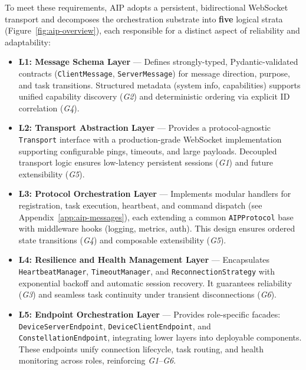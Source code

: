 To meet these requirements, AIP adopts a persistent, bidirectional WebSocket transport and decomposes the
orchestration substrate into \textbf{five} logical strata (Figure~\ref{fig:aip-overview}), each responsible for a distinct aspect of reliability and adaptability:
\begin{itemize}[leftmargin=2em]
    \item \textbf{L1: Message Schema Layer} — Defines strongly-typed, Pydantic-validated contracts (\texttt{ClientMessage}, \texttt{ServerMessage}) for message direction, purpose, and task transitions. Structured metadata (system info, capabilities) supports unified capability discovery (\textit{G2}) and deterministic ordering via explicit ID correlation (\textit{G4}).

    \item \textbf{L2: Transport Abstraction Layer} — Provides a protocol-agnostic \texttt{Transport} interface with a production-grade WebSocket implementation supporting configurable pings, timeouts, and large payloads. Decoupled transport logic ensures low-latency persistent sessions (\textit{G1}) and future extensibility (\textit{G5}).
    
    \item \textbf{L3: Protocol Orchestration Layer} — Implements modular handlers for registration, task execution, heartbeat, and command dispatch (see Appendix~\ref{app:aip-messages}), each extending a common \texttt{AIPProtocol} base with middleware hooks (logging, metrics, auth). This design ensures ordered state transitions (\textit{G4}) and composable extensibility (\textit{G5}).
    
    \item \textbf{L4: Resilience and Health Management Layer} — Encapsulates \texttt{HeartbeatManager}, \texttt{TimeoutManager}, and \texttt{ReconnectionStrategy} with exponential backoff and automatic session recovery. It guarantees reliability (\textit{G3}) and seamless task continuity under transient disconnections (\textit{G6}).
    
    \item \textbf{L5: Endpoint Orchestration Layer} — Provides role-specific facades: \texttt{DeviceServerEndpoint}, \texttt{DeviceClientEndpoint}, and \texttt{ConstellationEndpoint}, integrating lower layers into deployable components. These endpoints unify connection lifecycle, task routing, and health monitoring across roles, reinforcing \textit{G1}–\textit{G6}.
\end{itemize}


